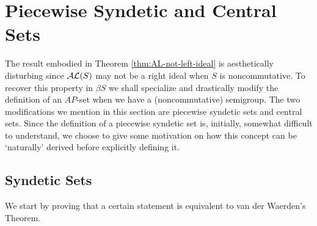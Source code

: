 \section{Piecewise Syndetic and Central Sets}
The result embodied in Theorem \ref{thm:AL-not-left-ideal} is aesthetically disturbing since $\mathcal{AL}(S)$ may not be a right ideal when $S$ is noncommutative. 
To recover this property in $\beta S$ we shall specialize and drastically modify the definition of an $AP$-set when we have a (noncommutative) semigroup.
The two modifications we mention in this section are piecewise syndetic sets and central sets.
Since the definition of a piecewise syndetic set is, initially, somewhat difficult to understand, we choose to give some motivation on how this concept can be `naturally' derived before explicitly defining it.


\subsection{Syndetic Sets}
We start by proving that a certain statement is equivalent to van der Waerden's Theorem.

